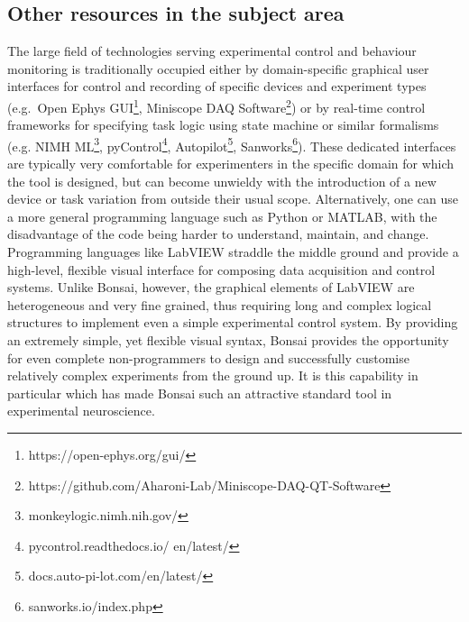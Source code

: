 \subsection*{Other resources in the subject area}

The large field of technologies serving experimental control and behaviour monitoring is traditionally occupied either by domain-specific graphical
user interfaces for control and recording of specific devices and experiment
types (e.g.\ Open Ephys
GUI\footnote{https://open-ephys.org/gui/},
Miniscope DAQ
Software\footnote{https://github.com/Aharoni-Lab/Miniscope-DAQ-QT-Software})
or by real-time control frameworks for specifying task logic using state
machine or similar formalisms (e.g. NIMH ML\footnote{monkeylogic.nimh.nih.gov/},
pyControl\footnote{pycontrol.readthedocs.io/ en/latest/},
Autopilot\footnote{docs.auto-pi-lot.com/en/latest/},
Sanworks\footnote{sanworks.io/index.php}).
These dedicated interfaces are typically very comfortable for experimenters in the specific domain for which the tool is designed, but can become unwieldy with the introduction of a new device or task variation from outside their usual scope. Alternatively, one can use a more general programming language such as Python or MATLAB, with the disadvantage
of the code being harder to understand, maintain, and change. Programming
languages like LabVIEW straddle the middle ground and provide a high-level, flexible visual interface for composing data acquisition and control systems. Unlike Bonsai, however, the graphical elements of LabVIEW are
heterogeneous and very fine grained, thus requiring long and complex
logical structures to implement even a simple experimental control system. By providing an extremely simple, yet flexible visual syntax, Bonsai provides the
opportunity for even complete non-programmers to design and successfully
customise relatively complex experiments from the ground up. It is this
capability in particular which has made Bonsai such an attractive standard tool in
experimental neuroscience.


